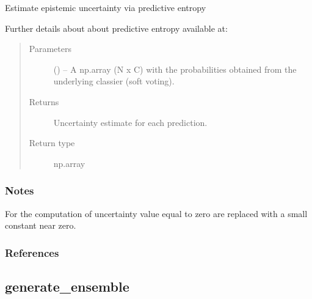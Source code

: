 \documentclass[letterpaper,10pt,english]{sphinxmanual}
\begin{document}
\begin{fulllineitems}
\label{\detokenize{api/ucf.compute_predictive_entropy:ucf.compute_predictive_entropy}}
Estimate epistemic uncertainty via predictive entropy %
\begin{footnote}[1]\sphinxAtStartFootnote
Further details about about predictive entropy available at:
%
\end{footnote}
\begin{quote}\begin{description}
\item[{Parameters}] \leavevmode
{} () -- A np.array (N x C) with the probabilities obtained from the
underlying classier (soft voting).

\item[{Returns}] \leavevmode
Uncertainty estimate for each prediction.

\item[{Return type}] \leavevmode
np.array

\end{description}\end{quote}
\subsubsection*{Notes}

For the computation of uncertainty value equal to zero are
replaced with a small constant near zero.
\subsubsection*{References}

\end{fulllineitems}



\subsection{generate\_ensemble}
\label{\detokenize{api/ucf.generate_ensemble:generate-ensemble}}\label{\detokenize{api/ucf.generate_ensemble::doc}}
\end{document}

